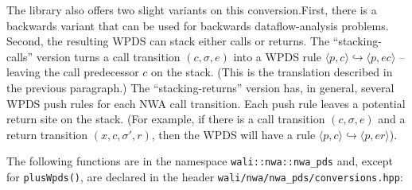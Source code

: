 The library also offers two slight variants on this conversion.First, there
is a backwards variant that can be used for backwards dataflow-analysis
problems. Second, the resulting WPDS can stack either calls or returns. The
``stacking-calls'' version turns a call transition $(c, \sigma, e)$ into a
WPDS rule $\langle p, c\rangle \hookrightarrow \langle p, e c\rangle$ --
leaving the call predecessor $c$ on the stack. (This is the translation
described in the previous paragraph.) The ``stacking-returns'' version
has, in general, several WPDS push rules for each NWA call transition. Each
push rule leaves a potential return site on the stack. (For example, if there
is a call transition $(c,\sigma,e)$ and a return transition $(x, c, \sigma',
r)$, then the WPDS will have a rule $\langle p,
c\rangle\hookrightarrow\langle p, e r\rangle$).


The following functions are in the namespace \texttt{wali::nwa::nwa\_pds}
and, except for \texttt{plusWpds()}, are declared in the header
\texttt{wali/nwa/nwa\_pds/conversions.hpp}:


